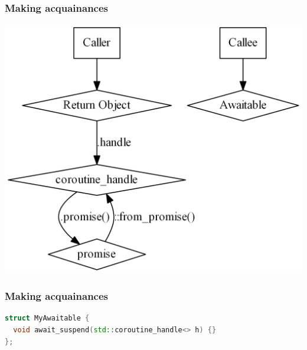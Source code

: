 \documentclass[aspectratio=169]{beamer}
\begin{document}
\begin{frame}[fragile]
  \frametitle{Making acquainances}
  
  \begin{center}
  \includegraphics[height=.9\textheight]{pipelinesgfx/acquaintances02.png}
  \end{center}
\end{frame}


\begin{frame}[fragile]
  \frametitle{Making acquainances}

  \begin{lstlisting}[language={C++}]
struct MyAwaitable {
  void await_suspend(std::coroutine_handle<> h) {}
};
  \end{lstlisting}
\end{frame}
\end{document}
